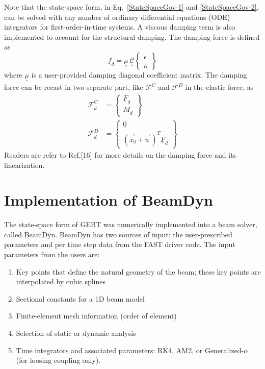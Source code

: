 \documentclass{aiaa-tc}
\newcommand{\tens}[1]{\underline{\underline{#1}}}
\renewcommand{\vec}[1]{\underline{#1}}
\begin{document}
Note that the state-space form, in
Eq.~\eqref{StateSpaceGov-1} and \eqref{StateSpaceGov-2}, can be solved with
any number of ordinary differential equations (ODE) integrators
for first-order-in-time systems. A viscous damping term is also implemented to account for the structural damping. The damping force is defined as
\begin{equation}
   \label{Damping}
   \vec{f}_d = \tens{\mu}~ \tens{\mathcal{C}} \begin{Bmatrix}
   \dot{\epsilon} \\
   \dot{\kappa}
   \end{Bmatrix}
\end{equation}
where $ \tens{\mu}$ is a user-provided damping diagonal coefficient matrix. The damping force can be recast in two separate part, like $\vec{\mathcal{F}}^C$ and $\vec{\mathcal{F}}^D$ in the elastic force, as
\begin{align}
   \label{DampingForce-1}
   \vec{\mathcal{F}}^C_d &= \begin{Bmatrix}
   \vec{F}_d \\
   \vec{M}_d
   \end{Bmatrix} \\
   \label{DampingForce-2}
   \vec{\mathcal{F}}^D_d &= \begin{Bmatrix}
    \vec{0} \\
    (\tilde{x}^\prime_0 + \tilde{u}^\prime)^T \underline{F}_d
    \end{Bmatrix}   
\end{align}
Readers are refer to Ref.[16] for more details on the damping force and its linearization.

\section{Implementation of BeamDyn}
The state-space form of GEBT was numerically implemented into a beam solver, called BeamDyn. BeamDyn has two sources of input:  the user-prescribed parameters and per time step data from the FAST driver code. The input parameters from the users are:
\begin{enumerate}
    \item Key points that define the natural geometry of the beam; these key points are interpolated by cubic splines
    \item Sectional constants for a 1D beam model
    \item Finite-element mesh information (order of element)
    \item Selection of static \cite{Wang:GEBT2014} or dynamic analysis
    \item Time integrators and associated parameters: RK4, AM2, or Generalized-$\alpha$ (for loosing coupling only).
\end{enumerate}
\end{document}
